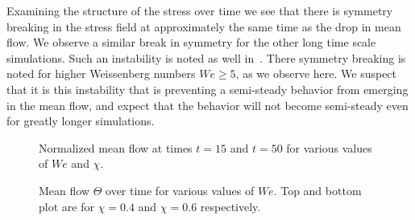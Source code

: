 Examining the structure of the stress over time we see that there is symmetry breaking in the stress field at approximately the same time as the drop in mean flow. We observe a similar break in symmetry for the other long time scale simulations. Such an instability is noted as well in~\cite{thomases2009transition}. There symmetry breaking is noted for higher Weissenberg numbers $We\geq 5$, as we observe here. We suspect that it is this instability that is preventing a semi-steady behavior from emerging in the mean flow, and expect that the behavior will not become semi-steady even for greatly longer simulations.

\begin{figure}
    \centering
{}
    \caption{Normalized mean flow at times $t=15$ and $t=50$ for various values of $We$ and $\chi$.}
    \label{fig:FullJaffrin}
\end{figure}


\begin{figure}
    \centering
    \caption{\small Mean flow $\Theta$ over time for various values of $We$. Top and bottom plot are for $\chi=0.4$ and $\chi=0.6$ respectively.}
    \label{fig:FlowOverTime}
\end{figure}

